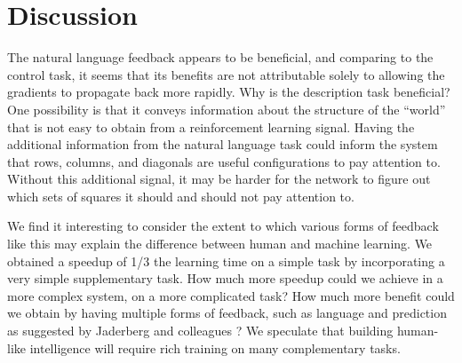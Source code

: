 \documentclass{article} %
\begin{document}
\section{Discussion}
The natural language feedback appears to be beneficial, and comparing to the control task, it seems that its benefits are not attributable solely to allowing the gradients to propagate back more rapidly. Why is the description task beneficial? One possibility is that it conveys information about the structure of the ``world'' that is not easy to obtain from a reinforcement learning signal. Having the additional information from the natural language task could inform the system that rows, columns, and diagonals are useful configurations to pay attention to. Without this additional signal, it may be harder for the network to figure out which sets of squares it should and should not pay attention to. \par
We find it interesting to consider the extent to which various forms of feedback like this may explain the difference between human and machine learning. We obtained a speedup of 1/3 the learning time on a simple task by incorporating a very simple supplementary task. How much more speedup could we achieve in a more complex system, on a more complicated task? How much more benefit could we obtain by having multiple forms of feedback, such as language and prediction as suggested by Jaderberg and colleagues \cite{Jaderberg2016}? We speculate that building human-like intelligence will require rich training on many complementary tasks.\par 
\end{document}
